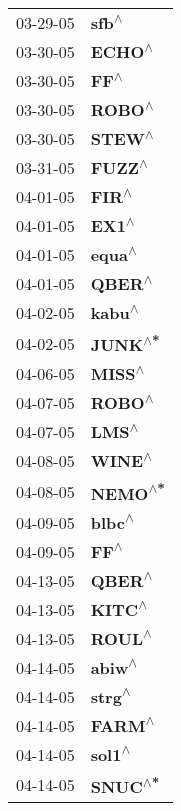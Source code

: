 \begin{supertabular}{p{0.08\textwidth}p{0.2\textwidth}}
 03-29-05 &     \textbf{sfb\textsuperscript{$\wedge$}} \\
 03-30-05 &    \textbf{ECHO\textsuperscript{$\wedge$}} \\
 03-30-05 &      \textbf{FF\textsuperscript{$\wedge$}} \\
 03-30-05 &    \textbf{ROBO\textsuperscript{$\wedge$}} \\
 03-30-05 &    \textbf{STEW\textsuperscript{$\wedge$}} \\
 03-31-05 &    \textbf{FUZZ\textsuperscript{$\wedge$}} \\
 04-01-05 &     \textbf{FIR\textsuperscript{$\wedge$}} \\
 04-01-05 &     \textbf{EX1\textsuperscript{$\wedge$}} \\
 04-01-05 &    \textbf{equa\textsuperscript{$\wedge$}} \\
 04-01-05 &    \textbf{QBER\textsuperscript{$\wedge$}} \\
 04-02-05 &    \textbf{kabu\textsuperscript{$\wedge$}} \\
 04-02-05 &   \textbf{JUNK\textsuperscript{$\wedge$*}} \\
 04-06-05 &    \textbf{MISS\textsuperscript{$\wedge$}} \\
 04-07-05 &    \textbf{ROBO\textsuperscript{$\wedge$}} \\
 04-07-05 &     \textbf{LMS\textsuperscript{$\wedge$}} \\
 04-08-05 &    \textbf{WINE\textsuperscript{$\wedge$}} \\
 04-08-05 &   \textbf{NEMO\textsuperscript{$\wedge$*}} \\
 04-09-05 &    \textbf{blbc\textsuperscript{$\wedge$}} \\
 04-09-05 &      \textbf{FF\textsuperscript{$\wedge$}} \\
 04-13-05 &    \textbf{QBER\textsuperscript{$\wedge$}} \\
 04-13-05 &    \textbf{KITC\textsuperscript{$\wedge$}} \\
 04-13-05 &    \textbf{ROUL\textsuperscript{$\wedge$}} \\
 04-14-05 &    \textbf{abiw\textsuperscript{$\wedge$}} \\
 04-14-05 &    \textbf{strg\textsuperscript{$\wedge$}} \\
 04-14-05 &    \textbf{FARM\textsuperscript{$\wedge$}} \\
 04-14-05 &    \textbf{sol1\textsuperscript{$\wedge$}} \\
 04-14-05 &   \textbf{SNUC\textsuperscript{$\wedge$*}} \\

\end{supertabular}
